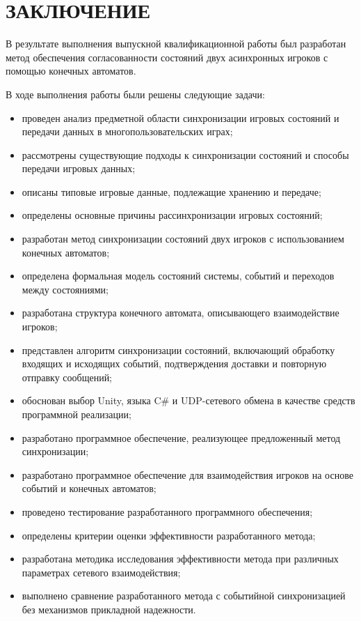 \chapter*{ЗАКЛЮЧЕНИЕ}

В результате выполнения выпускной квалификационной работы был разработан метод обеспечения согласованности состояний двух асинхронных игроков с помощью конечных автоматов.

В ходе выполнения работы были решены следующие задачи:
\begin{itemize}
	\item проведен анализ предметной области синхронизации игровых состояний и передачи данных в многопользовательских играх;
	\item рассмотрены существующие подходы к синхронизации состояний и способы передачи игровых данных;
	\item описаны типовые игровые данные, подлежащие хранению и передаче;
	\item определены основные причины рассинхронизации игровых состояний;
	\item разработан метод синхронизации состояний двух игроков с использованием конечных автоматов;
	\item определена формальная модель состояний системы, событий и переходов между состояниями;
	\item разработана структура конечного автомата, описывающего взаимодействие игроков;
	\item представлен алгоритм синхронизации состояний, включающий обработку входящих и исходящих событий, подтверждения доставки и повторную отправку сообщений;
	\item обоснован выбор Unity, языка C\# и UDP-сетевого обмена в качестве средств программной реализации;
	\item разработано программное обеспечение, реализующее предложенный метод синхронизации;
	\item разработано программное обеспечение для взаимодействия игроков на основе событий и конечных автоматов;
	\item проведено тестирование разработанного программного обеспечения;
	\item определены критерии оценки эффективности разработанного метода;
	\item разработана методика исследования эффективности метода при различных параметрах сетевого взаимодействия;
	\item выполнено сравнение разработанного метода с событийной синхронизацией без механизмов прикладной надежности.
\end{itemize}

